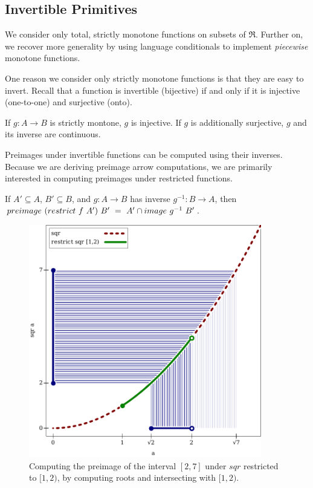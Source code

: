 \subsection{Invertible Primitives}

We consider only total, strictly monotone functions on subsets of $\Re$.
Further on, we recover more generality by using language conditionals to implement \emph{piecewise} monotone functions.

One reason we consider only strictly monotone functions is that they are easy to invert.
Recall that a function is invertible (bijective) if and only if it is injective (one-to-one) and surjective (onto).

\begin{lemma}
\label{lem:monotone-implies-invertible}
If $g : A \to B$ is strictly montone, $g$ is injective.
If $g$ is additionally surjective, $g$ and its inverse are continuous.
\end{lemma}

Preimages under invertible functions can be computed using their inverses.
Because we are deriving preimage arrow computations, we are primarily interested in computing preimages under restricted functions.

\begin{lemma}
\label{lem:invertible-function-preimages}
If $A' \subseteq A$, $B' \subseteq B$, and $g : A \to B$ has inverse $g^{-1} : B \to A$, then $preimage~(restrict~f~A')~B'\ =\ A' \cap image~g^{-1}~B'$.
\end{lemma}

\begin{figure}[!tb]
\centering
\includegraphics[width=4in]{figures/preimage-by-inverse-image}
\caption[{Computing the preimage of $[2,7]$}]{Computing the preimage of the interval $[2,7]$ under $sqr$ restricted to $[1,2)$, by computing roots and intersecting with $[1,2)$.}
\label{fig:sqr-preimage}
\end{figure}

